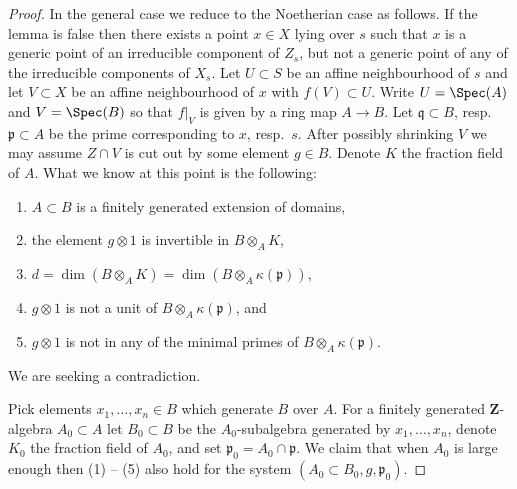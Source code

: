 \begin{proof}
\medskip\noindent
In the general case we reduce to the Noetherian case as follows.
If the lemma is false then there exists a point
$x \in X$ lying over $s$ such that $x$ is a generic point of an
irreducible component of $Z_s$, but
not a generic point of any of the irreducible components of $X_s$.
Let $U \subset S$ be an affine neighbourhood of $s$ and let
$V \subset X$ be an affine neighbourhood of $x$ with $f(V) \subset U$.
Write $U = \Spec(A)$ and $V = \Spec(B)$ so that $f|_V$
is given by a ring map $A \to B$. Let $\mathfrak q \subset B$,
resp.\ $\mathfrak p \subset A$ be the prime corresponding to $x$, resp.\ $s$.
After possibly shrinking $V$ we may assume $Z \cap V$ is cut out by
some element $g \in B$. Denote $K$ the fraction field of $A$.
What we know at this point is the following:
\begin{enumerate}
\item $A \subset B$ is a finitely generated extension of domains,
\item the element $g \otimes 1$ is invertible in $B \otimes_A K$,
\item $d = \dim(B \otimes_A K) = \dim(B \otimes_A \kappa(\mathfrak p))$,
\item $g \otimes 1$ is not a unit of $B \otimes_A \kappa(\mathfrak p)$, and
\item $g \otimes 1$ is not in any of the minimal primes of
$B \otimes_A \kappa(\mathfrak p)$.
\end{enumerate}
We are seeking a contradiction.

\medskip\noindent
Pick elements $x_1, \ldots, x_n \in B$ which generate $B$ over $A$.
For a finitely generated $\mathbf{Z}$-algebra $A_0 \subset A$
let $B_0 \subset B$ be the $A_0$-subalgebra generated by
$x_1, \ldots, x_n$, denote $K_0$ the fraction field of $A_0$, and set
$\mathfrak p_0 = A_0 \cap \mathfrak p$.
We claim that when $A_0$ is large enough then (1) -- (5) also hold for
the system $(A_0 \subset B_0, g, \mathfrak p_0)$.


\end{proof}
